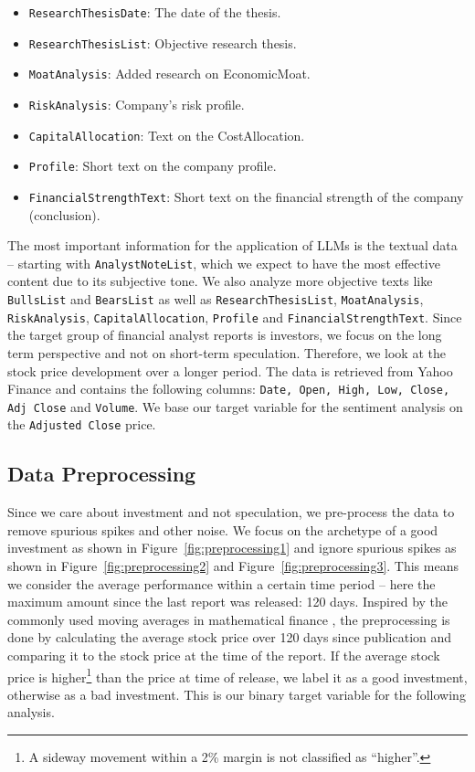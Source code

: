 \documentclass[conference]{IEEEtran}
\begin{document}
\begin{itemize}
  \item \texttt{ResearchThesisDate}: The date of the thesis.
  \item \texttt{ResearchThesisList}: Objective research thesis.
  \item \texttt{MoatAnalysis}: Added research on EconomicMoat.
  \item \texttt{RiskAnalysis}: Company's risk profile. 
  \item \texttt{CapitalAllocation}: Text on the CostAllocation. 
  \item \texttt{Profile}: Short text on the company profile.
  \item \texttt{FinancialStrengthText}: Short text on the financial strength of the company (conclusion).
\end{itemize}
The most important information for the application of LLMs is the textual data -- starting with \texttt{AnalystNoteList}, which we expect to have the most effective content due to its subjective tone. We also analyze more objective texts like \texttt{BullsList} and \texttt{BearsList} as well as \texttt{ResearchThesisList}, \texttt{MoatAnalysis}, \texttt{RiskAnalysis}, \texttt{CapitalAllocation}, \texttt{Profile} and \texttt{FinancialStrengthText}.
Since the target group of financial analyst reports is investors, we focus on the long term perspective and not on short-term speculation. Therefore, we look at the stock price development over a longer period. The data is retrieved from Yahoo Finance and contains the following columns: \texttt{Date, Open, High, Low, Close, Adj Close} and \texttt{Volume}. We base our target variable for the sentiment analysis on the \texttt{Adjusted Close} price.

\subsection{Data Preprocessing}%
Since we care about investment and not speculation, we pre-process the data to remove spurious spikes and other noise. We focus on the archetype of a good investment as shown in Figure~\ref{fig:preprocessing1} and ignore spurious spikes as shown in Figure~\ref{fig:preprocessing2} and Figure~\ref{fig:preprocessing3}. This means we consider the average performance within a certain time period -- here the maximum amount since the last report was released: 120 days. Inspired by the commonly used moving averages in mathematical finance \cite{Hull2021}, the preprocessing is done by calculating the average stock price over 120 days since publication and comparing it to the stock price at the time of the report. If the average stock price is higher\footnote{A sideway movement within a 2\% margin is not classified as ``higher''.} than the price at time of release, we label it as a good investment, otherwise as a bad investment. This is our binary target variable for the following analysis.
\end{document}
